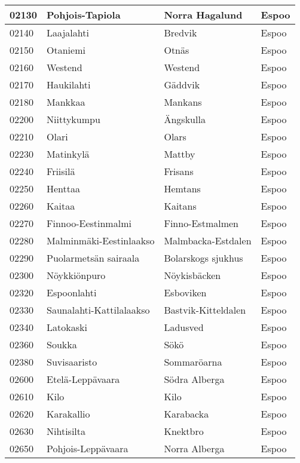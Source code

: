 \begin{longtable}{llll}
    02130 & Pohjois-Tapiola & Norra Hagalund & Espoo \\ [0.25ex] \hline
    02140 & Laajalahti & Bredvik & Espoo \\ [0.25ex] \hline
    02150 & Otaniemi & Otnäs & Espoo \\ [0.25ex] \hline
    02160 & Westend & Westend & Espoo \\ [0.25ex] \hline
    02170 & Haukilahti & Gäddvik & Espoo \\ [0.25ex] \hline
    02180 & Mankkaa & Mankans & Espoo \\ [0.25ex] \hline
    02200 & Niittykumpu & Ängskulla & Espoo \\ [0.25ex] \hline
    02210 & Olari & Olars & Espoo \\ [0.25ex] \hline
    02230 & Matinkylä & Mattby & Espoo \\ [0.25ex] \hline
    02240 & Friisilä & Frisans & Espoo \\ [0.25ex] \hline
    02250 & Henttaa & Hemtans & Espoo \\ [0.25ex] \hline
    02260 & Kaitaa & Kaitans & Espoo \\ [0.25ex] \hline
    02270 & Finnoo-Eestinmalmi & Finno-Estmalmen & Espoo \\ [0.25ex] \hline
    02280 & Malminmäki-Eestinlaakso & Malmbacka-Estdalen & Espoo \\ [0.25ex] \hline
    02290 & Puolarmetsän sairaala & Bolarskogs sjukhus & Espoo \\ [0.25ex] \hline
    02300 & Nöykkiönpuro & Nöykisbäcken & Espoo \\ [0.25ex] \hline
    02320 & Espoonlahti & Esboviken & Espoo \\ [0.25ex] \hline
    02330 & Saunalahti-Kattilalaakso & Bastvik-Kitteldalen & Espoo \\ [0.25ex] \hline
    02340 & Latokaski & Ladusved & Espoo \\ [0.25ex] \hline
    02360 & Soukka & Sökö & Espoo \\ [0.25ex] \hline
    02380 & Suvisaaristo & Sommaröarna & Espoo \\ [0.25ex] \hline
    02600 & Etelä-Leppävaara & Södra Alberga & Espoo \\ [0.25ex] \hline
    02610 & Kilo & Kilo & Espoo \\ [0.25ex] \hline
    02620 & Karakallio & Karabacka & Espoo \\ [0.25ex] \hline
    02630 & Nihtisilta & Knektbro & Espoo \\ [0.25ex] \hline
    02650 & Pohjois-Leppävaara & Norra Alberga & Espoo \\ [0.25ex] \hline

\end{longtable}
